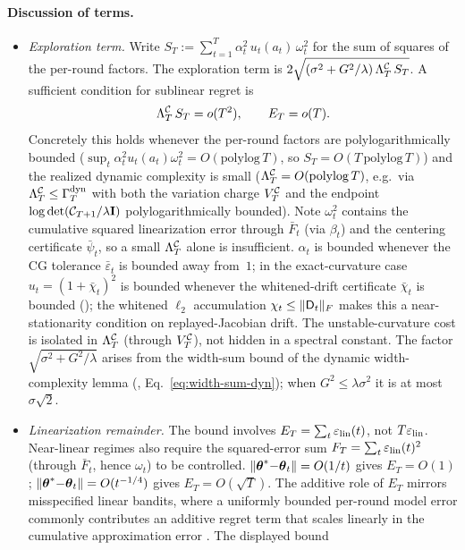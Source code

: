 \paragraph{Discussion of terms.}
\begin{itemize}[nosep,leftmargin=1.5em]
\item \emph{Exploration term.}
Write $S_T:=\sum_{t=1}^T\alpha_t^2\,u_t(a_t)\,\omega_t^2$ for the sum of
squares of the per-round factors.  The exploration term is
$2\sqrt{(\sigma^2+G^2/\lambda)\,\Lambda^{\mathcal{C}}_T\,S_T}$.  A sufficient condition
for sublinear regret is
\[
  \Lambda^{\mathcal{C}}_T\,S_T = o(T^2),
  \qquad
  E_T=o(T).
\]
Concretely this holds whenever the per-round factors are polylogarithmically
bounded ($\sup_t\alpha_t^2 u_t(a_t)\omega_t^2 = O(\mathrm{polylog}\,T)$, so
$S_T=O(T\,\mathrm{polylog}\,T)$) and the realized dynamic complexity is
small ($\Lambda^{\mathcal{C}}_T=O(\mathrm{polylog}\,T)$, e.g.\ via $\Lambda^{\mathcal{C}}_T\le\Gamma^{\mathrm{dyn}}_T$
with both the variation charge $V^{\mathcal{C}}_T$ and the endpoint
$\log\det(\mathcal{C}_{T+1}/\lambda\mathbf{I})$ polylogarithmically bounded).
Note $\omega_t^2$ contains the cumulative squared linearization error
through $\bar F_t$ (via $\beta_t$) and the centering certificate
$\bar\psi_t$, so a small $\Lambda^{\mathcal{C}}_T$ alone is insufficient.
$\alpha_t$ is bounded whenever the CG tolerance $\bar\varepsilon_t$ is
bounded away from~$1$; in the exact-curvature case $u_t=(1+\bar\chi_t)^2$
is bounded whenever the whitened-drift certificate $\bar\chi_t$ is bounded
(); the whitened $\ell_2$ accumulation
$\chi_t\le\|\mathsf{D}_t\|_F$ makes this a near-stationarity condition on
replayed-Jacobian drift.  The unstable-curvature cost is isolated in
$\Lambda^{\mathcal{C}}_T$ (through $V^{\mathcal{C}}_T$), not hidden in a spectral constant.
The factor $\sqrt{\sigma^2+G^2/\lambda}$ arises from the width-sum bound of the
dynamic width-complexity lemma (,
Eq.~\eqref{eq:width-sum-dyn}); when $G^2\le\lambda\sigma^2$ it is at most
$\sigma\sqrt2$.
\item \emph{Linearization remainder.}
The bound involves $E_T=\sum_t\varepsilon_{\mathrm{lin}}(t)$, not $T\varepsilon_{\mathrm{lin}}$.
Near-linear regimes also require the squared-error sum
$F_T=\sum_t\varepsilon_{\mathrm{lin}}(t)^2$ (through $\bar F_t$, hence $\omega_t$) to be
controlled.  $\|\boldsymbol{\theta}^*{-}\boldsymbol{\theta}_t\|=O(1/t)$ gives $E_T=O(1)$;
$\|\boldsymbol{\theta}^*{-}\boldsymbol{\theta}_t\|=O(t^{-1/4})$ gives $E_T=O(\sqrt{T})$.
The additive role of $E_T$ mirrors misspecified linear bandits, where a
uniformly bounded per-round model error commonly contributes an additive regret
term that scales linearly in the cumulative approximation error
\citep{ghosh2017misspecified,lattimore2020learning}.  The displayed bound

\end{itemize}

